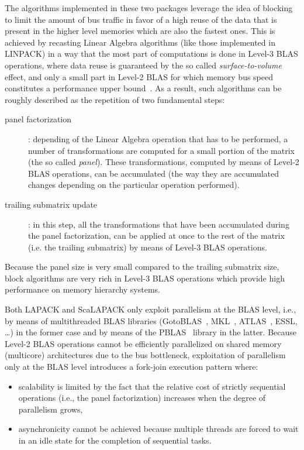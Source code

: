 \documentclass{article}
\begin{document}
The algorithms implemented in these two packages leverage the idea of
blocking to limit the amount of bus traffic in favor of a high reuse
of the data that is present in the higher level memories which are
also the fastest ones. This is achieved by recasting Linear Algebra
algorithms (like those implemented in LINPACK) in a way that the most
part of computations is done in Level-3 BLAS operations, where data
reuse is guaranteed by the so called {\it surface-to-volume} effect,
and only a small part in Level-2 BLAS for which memory bus speed
constitutes a performance upper bound~\cite{552704}.  As a result,
such algorithms can be roughly described as the repetition of two
fundamental steps:
\begin{description}
\item[panel factorization]: depending of the Linear Algebra operation
  that has to be performed, a number of transformations are computed
  for a small portion of the matrix (the so called {\it panel}). These
  transformations, computed by means of Level-2 BLAS operations, can
  be accumulated (the way they are accumulated changes depending on
  the particular operation performed).
\item[trailing submatrix update]: in this step, all the
  transformations that have been accumulated during the panel
  factorization, can be applied at once to the rest of the matrix
  (i.e. the trailing submatrix) by means of Level-3 BLAS operations.
\end{description}
Because the panel size is very small compared to the trailing
submatrix size, block algorithms are very rich in Level-3 BLAS
operations which provide high performance on memory hierarchy
systems. 

Both LAPACK and ScaLAPACK only exploit parallelism at the BLAS level,
i.e., by means of multithreaded BLAS libraries
(GotoBLAS~\cite{gotoblas}, MKL~\cite{mkl}, ATLAS~\cite{ATLAS},
ESSL\cite{essl01}, \dots) in the former case and by means of the
PBLAS~\cite{666023} library in the latter. Because Level-2 BLAS
operations cannot be efficiently parallelized on shared memory
(multicore) architectures due to the bus bottleneck, exploitation of
parallelism only at the BLAS level introduces a fork-join execution
pattern where:
\begin{itemize}
\item scalability is limited by the fact that the relative cost of
  strictly sequential operations (i.e., the panel factorization)
  increases when the degree of parallelism grows,
\item asynchronicity cannot be achieved because multiple threads are
  forced to wait in an idle state for the completion of sequential
  tasks. 
\end{itemize}
\end{document}
